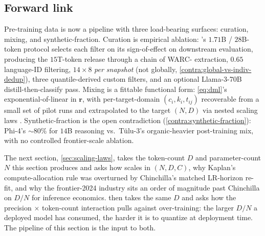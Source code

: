\subsection{Forward link}
\label{sec:data-forward}

Pre-training data is now a pipeline with three load-bearing surfaces:
curation, mixing, and synthetic-fraction. Curation is empirical
ablation: \citet{fineweb2024}'s $1.71$B / $28$B-token protocol
selects each filter on its sign-of-effect on downstream evaluation,
producing the $15$T-token  release through a chain of
WARC- extraction, $0.65$ language-ID filtering, $14
\times 8$  \emph{per snapshot} (not globally,
\cref{contra:global-vs-indiv-dedup}), three quantile-derived custom
filters, and an optional Llama-3-70B distill-then-classify pass.
Mixing is a fittable functional form: \cref{eq:dml}'s
exponential-of-linear in $\mathbf{r}$, with per-target-domain
$(c_i, k_i, t_{ij})$ recoverable from a small set of pilot runs and
extrapolated to the target $(N, D)$ via nested scaling laws
\citep{data-mixing-laws-2024}. Synthetic-fraction is the open
contradiction (\cref{contra:synthetic-fraction}): Phi-4's
$\sim\!80\%$ for $14$B reasoning vs.\ Tülu-3's organic-heavier
post-training mix, with no controlled frontier-scale ablation.

The next section, \cref{sec:scaling-laws}, takes the token-count $D$
and parameter-count $N$ this section produces and asks how
 scales in $(N, D, C)$, why Kaplan's
compute-allocation rule was overturned by Chinchilla's matched
LR-horizon re-fit, and why the frontier-2024 industry sits an order
of magnitude past Chinchilla on $D / N$ for inference economics.
 then takes the same $D$ and asks how the
precision $\times$ token-count interaction \citep[\S
4]{scaling-laws-precision-2024} pulls against over-training: the
larger $D / N$ a deployed model has consumed, the harder it is to
quantize at deployment time. The pipeline of this section is the
input to both.
